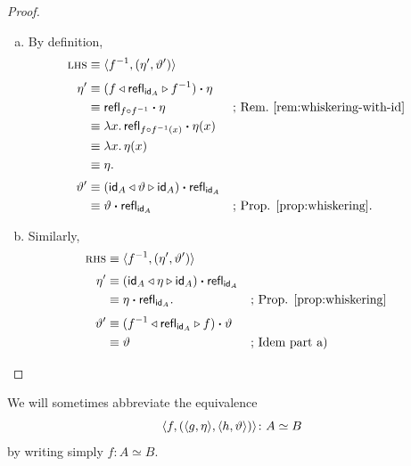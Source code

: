 \begin{proof}${}$
    \begin{enumerate}[a)]
        \item By definition,
        \begin{align*}
            \textsc{lhs}&\equiv\langle f^{-1},(\eta',\vartheta')\rangle\\[1mm]
            \eta'&\equiv(f\triangleleft\mathsf{refl}_{\mathsf{id}_A}\triangleright f^{-1})\mathbin{\boldsymbol{\cdot}}\eta\\
                &\equiv\mathsf{refl}_{f\circ f^{-1}}\mathbin{\boldsymbol{\cdot}}\eta
                    &&\text{; Rem.~\ref{rem:whiskering-with-id}}\\
                &\equiv\lambda x.\,
                    \mathsf{refl}_{f\circ f^{-1}(x)}\mathbin{\boldsymbol{\cdot}}\eta(x)\\
                &\equiv\lambda x.\,\eta(x)\\
                &\equiv\eta.\\[1mm]
            \vartheta'&\equiv(\mathsf{id}_A\triangleleft\vartheta\triangleright\mathsf{id}_A)
                    \mathbin{\boldsymbol{\cdot}}\mathsf{refl}_{\mathsf{id}_A}\\
                &\equiv\vartheta\mathbin{\boldsymbol{\cdot}}\mathsf{refl}_{\mathsf{id}_A}
                    &&\text{; Prop. \ref{prop:whiskering}}.
        \end{align*}

        \item Similarly,
        \begin{align*}
            \textsc{rhs}&\equiv\langle f^{-1},(\eta',\vartheta')\rangle\\[1mm]
            \eta'&\equiv(\mathsf{id}_A\triangleleft\eta\triangleright\mathsf{id}_A)
                    \mathbin{\boldsymbol{\cdot}}\mathsf{refl}_{\mathsf{id}_A}\\
                &\equiv\eta\mathbin{\boldsymbol{\cdot}}\mathsf{refl}_{\mathsf{id}_A}.
                    &&\text{; Prop. \ref{prop:whiskering}}\\[1mm]
            \vartheta'&\equiv
                (f^{-1}\triangleleft\mathsf{refl}_{\mathsf{id}_A}\triangleright f)
                    \mathbin{\boldsymbol{\cdot}}\vartheta\\
                &\equiv\vartheta
                    &&\text{; Idem part a)}
        \end{align*}
    \end{enumerate}
\end{proof}


\begin{ntn}\label{ntn:abuse-equivalence}
    We will sometimes abbreviate the equivalence
    \[
        \dep{f,(\dep{g,\eta},\dep{h,\vartheta})}
            \colon A\simeq B
    \]
    by writing simply\/ $f\colon A\simeq B$.
\end{ntn}

